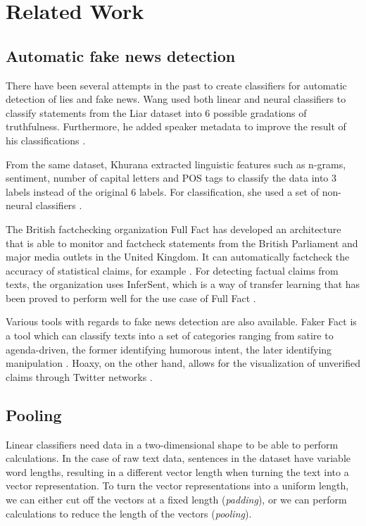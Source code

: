 \section{Related Work}
\subsection{Automatic fake news detection}
There have been several attempts in the past to create classifiers for automatic detection of lies and fake news. 
Wang used both linear and neural classifiers to classify statements from the Liar dataset into 6 possible gradations of truthfulness. 
Furthermore, he added speaker metadata to improve the result of his classifications \cite{wang2018}.

From the same dataset, Khurana extracted linguistic features such as n-grams, sentiment, number of capital letters and POS tags to classify the data into 3 labels instead of the original 6 labels. 
For classification, she used a set of non-neural classifiers \cite{khurana2017}.

The British factchecking organization Full Fact has developed an architecture that is able to monitor and factcheck statements from the British Parliament and major media outlets in the United Kingdom. 
It can automatically factcheck the accuracy of statistical claims, for example \cite{babakar2016}.
For detecting factual claims from texts, the organization uses InferSent, which is a way of transfer learning that has been proved to perform well for the use case of Full Fact \cite{pydata2018}.

Various tools with regards to fake news detection are also available. 
Faker Fact is a tool which can classify texts into a set of categories ranging from satire to agenda-driven, the former identifying humorous intent, the later identifying manipulation \cite{fakerfact}. 
Hoaxy, on the other hand, allows for the visualization of unverified claims through Twitter networks \cite{shao2016}. 

\subsection{Pooling}
Linear classifiers need data in a two-dimensional shape to be able to perform calculations. 
In the case of raw text data, sentences in the dataset have variable word lengths, resulting in a different vector length when turning the text into a vector representation.
To turn the vector representations into a uniform length, we can either cut off the vectors at a fixed length (\textit{padding}), or we can perform calculations to reduce the length of the vectors (\textit{pooling}).

